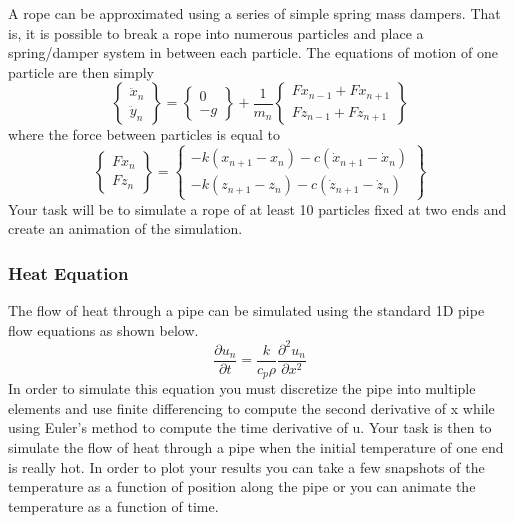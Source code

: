 A rope can be approximated using a series of simple spring mass
dampers. That is, it is possible to break a rope into numerous
particles and place a spring/damper system in between each
particle. The equations of motion of one particle are then simply
\begin{equation}
\begin{Bmatrix} \ddot{x}_n \\ \ddot{y}_n \end{Bmatrix} = \begin{Bmatrix} 0
  \\ -g \end{Bmatrix} + \frac{1}{m_n}\begin{Bmatrix} Fx_{n-1} + Fx_{n+1}
  \\ Fz_{n-1} + Fz_{n+1} \end{Bmatrix}
\end{equation}
where the force between particles is equal to
\begin{equation}
\begin{Bmatrix} Fx_{n} \\ Fz_{n} \end{Bmatrix} = \begin{Bmatrix}
  -k(x_{n+1} - x_{n}) - c(\dot{x}_{n+1} - \dot{x}_{n}) \\ -k(z_{n+1} -
  z_{n}) - c(\dot{z}_{n+1} - \dot{z}_{n}) \end{Bmatrix}
\end{equation}
Your task will be to simulate a rope of at least 10 particles fixed at
two ends and create an animation of the simulation.

\subsubsection{Heat Equation}

The flow of heat through a pipe can be simulated using the standard 1D
pipe flow equations as shown below. 
\begin{equation}
\frac{\partial u_n}{\partial t} = \frac{k}{c_p\rho}\frac{\partial^2
  u_n}{\partial x^2}
\end{equation}
In order to simulate this equation you must discretize the pipe into
multiple elements and use finite differencing to compute the second
derivative of x while using Euler's method to compute the time
derivative of u. Your task is then to simulate the flow of heat
through a pipe when the initial temperature of one end is really
hot. In order to plot your results you can take a few snapshots of the
temperature as a function of position along the pipe or you can
animate the temperature as a function of time.

